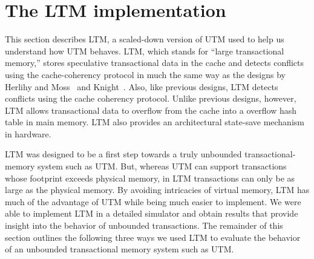 \newcommand{\subheading}[1]{\subsubsection{#1}}
\section{The LTM implementation}\label{sec:ltm}


This section describes LTM, a scaled-down version of UTM used to help
us understand how UTM behaves.  LTM, which stands for ``large
transactional memory,'' stores speculative transactional data in the
cache and detects conflicts using the cache-coherency protocol in much
the same way as the designs by Herlihy and Moss~\cite{HerlihyMo92} and
Knight~\cite{Knight86,Knight89}.  Also, like previous designs, LTM
detects conflicts using the cache coherency protocol.  Unlike previous
designs, however, LTM allows transactional data to overflow from the
cache into a overflow hash table in main memory.  LTM also provides an
architectural state-save mechanism in hardware.

LTM was designed to be a first step towards a truly unbounded
transactional-memory system such as UTM\@.  But, whereas UTM can
support transactions whose footprint exceeds physical memory, in LTM
transactions can only be as large as the physical memory.  By avoiding
intricacies of virtual memory, LTM has much of the advantage of UTM
while being much easier to implement.  We were able to implement LTM
in a detailed simulator and obtain results that provide insight into
the behavior of unbounded transactions.  The remainder of this section
outlines the following three ways we used LTM to evaluate the behavior
of an unbounded transactional memory system such as UTM.

